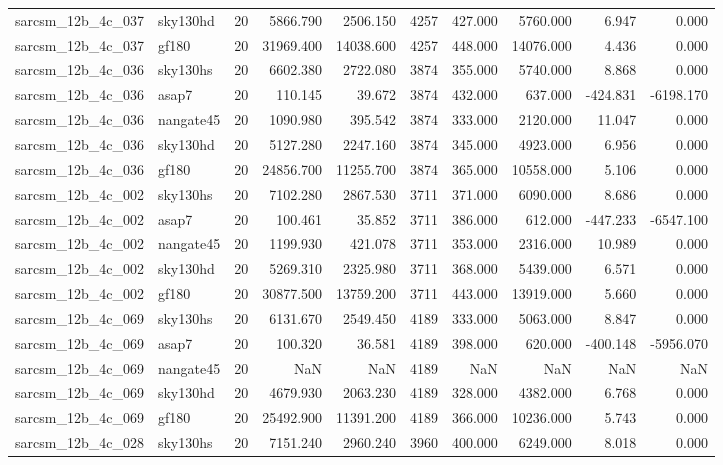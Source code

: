 \documentclass{article}
\begin{document}
\begin{longtable}{llrrrrrrrr}
sarcsm\_12b\_4c\_037 & sky130hd & 20 & 5866.790 & 2506.150 & 4257 & 427.000 & 5760.000 & 6.947 & 0.000 \\
sarcsm\_12b\_4c\_037 & gf180 & 20 & 31969.400 & 14038.600 & 4257 & 448.000 & 14076.000 & 4.436 & 0.000 \\
sarcsm\_12b\_4c\_036 & sky130hs & 20 & 6602.380 & 2722.080 & 3874 & 355.000 & 5740.000 & 8.868 & 0.000 \\
sarcsm\_12b\_4c\_036 & asap7 & 20 & 110.145 & 39.672 & 3874 & 432.000 & 637.000 & -424.831 & -6198.170 \\
sarcsm\_12b\_4c\_036 & nangate45 & 20 & 1090.980 & 395.542 & 3874 & 333.000 & 2120.000 & 11.047 & 0.000 \\
sarcsm\_12b\_4c\_036 & sky130hd & 20 & 5127.280 & 2247.160 & 3874 & 345.000 & 4923.000 & 6.956 & 0.000 \\
sarcsm\_12b\_4c\_036 & gf180 & 20 & 24856.700 & 11255.700 & 3874 & 365.000 & 10558.000 & 5.106 & 0.000 \\
sarcsm\_12b\_4c\_002 & sky130hs & 20 & 7102.280 & 2867.530 & 3711 & 371.000 & 6090.000 & 8.686 & 0.000 \\
sarcsm\_12b\_4c\_002 & asap7 & 20 & 100.461 & 35.852 & 3711 & 386.000 & 612.000 & -447.233 & -6547.100 \\
sarcsm\_12b\_4c\_002 & nangate45 & 20 & 1199.930 & 421.078 & 3711 & 353.000 & 2316.000 & 10.989 & 0.000 \\
sarcsm\_12b\_4c\_002 & sky130hd & 20 & 5269.310 & 2325.980 & 3711 & 368.000 & 5439.000 & 6.571 & 0.000 \\
sarcsm\_12b\_4c\_002 & gf180 & 20 & 30877.500 & 13759.200 & 3711 & 443.000 & 13919.000 & 5.660 & 0.000 \\
sarcsm\_12b\_4c\_069 & sky130hs & 20 & 6131.670 & 2549.450 & 4189 & 333.000 & 5063.000 & 8.847 & 0.000 \\
sarcsm\_12b\_4c\_069 & asap7 & 20 & 100.320 & 36.581 & 4189 & 398.000 & 620.000 & -400.148 & -5956.070 \\
sarcsm\_12b\_4c\_069 & nangate45 & 20 & NaN & NaN & 4189 & NaN & NaN & NaN & NaN \\
sarcsm\_12b\_4c\_069 & sky130hd & 20 & 4679.930 & 2063.230 & 4189 & 328.000 & 4382.000 & 6.768 & 0.000 \\
sarcsm\_12b\_4c\_069 & gf180 & 20 & 25492.900 & 11391.200 & 4189 & 366.000 & 10236.000 & 5.743 & 0.000 \\
sarcsm\_12b\_4c\_028 & sky130hs & 20 & 7151.240 & 2960.240 & 3960 & 400.000 & 6249.000 & 8.018 & 0.000 \\

\end{longtable}
\end{document}
